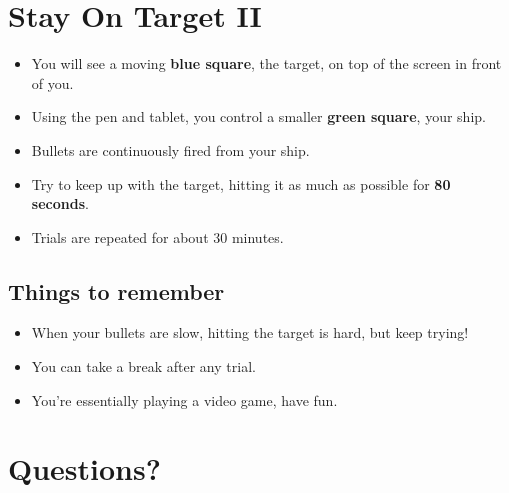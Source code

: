 \documentclass[12pt,letterpaper]{scrartcl}
\date{}
\begin{document}
\section*{Stay On Target II}




\begin{itemize}
\item You will see a moving \textbf{blue square}, the target, on top of the screen in front of you.\\
\item Using the pen and tablet, you control a smaller \textbf{green square}, your ship.\\
\item Bullets are continuously fired from your ship.\\
\item Try to keep up with the target, hitting it as much as possible for \textbf{80 seconds}.\\
\item Trials are repeated for about 30 minutes.
\end{itemize}

\bigskip

\subsection*{Things to remember}
\begin{itemize}
\item When your bullets are slow, hitting the target is hard, but keep trying!
\item You can take a break after any trial.
\item You're essentially playing a video game, have fun.
\end{itemize}

\section*{Questions?}

\vfill

\end{document}
